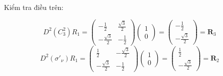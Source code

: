 \documentclass{report}
\begin{document}
Kiểm tra điều trên:

\[
	\renewcommand{\arraystretch}{0.75}
	D^2\left(C_3^2\right)R_1 =
	\begin{pmatrix}
		-\frac{1}{2}        & \frac{\sqrt{3}}{2} \\
		-\frac{\sqrt{3}}{2} & -\frac{1}{2}
	\end{pmatrix}
	\begin{pmatrix}
		1 \\
		0
	\end{pmatrix}
	=
	\begin{pmatrix}
		-\frac{1}{2} \\
		-\frac{\sqrt{3}}{2}
	\end{pmatrix}
	= \textbf{R}_3
\]
\[
	\renewcommand{\arraystretch}{0.75}
	D^2\left(\sigma'_\nu\right)R_1 =
	\begin{pmatrix}
		\frac{1}{2}         & -\frac{\sqrt{3}}{2} \\
		-\frac{\sqrt{3}}{2} & -\frac{1}{2}
	\end{pmatrix}
	\begin{pmatrix}
		1 \\
		0
	\end{pmatrix}
	=
	\begin{pmatrix}
		\frac{1}{2} \\
		-\frac{\sqrt{3}}{2}
	\end{pmatrix}
	= \textbf{R}_2
\]
\end{document}
